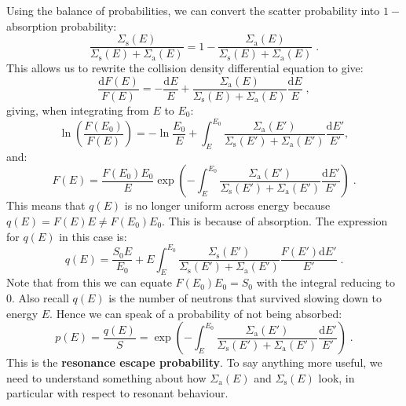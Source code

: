 Using the balance of probabilities, we can convert the scatter probability into $1 - $ absorption probability:
\begin{equation*}
    \frac{\Sigma_\mathrm{s}(E)}{\Sigma_\mathrm{s}(E) + \Sigma_\mathrm{a}(E)} = 1 - \frac{\Sigma_\mathrm{a}(E)}{\Sigma_\mathrm{s}(E) + \Sigma_\mathrm{a}(E)}\;\mathrm{.}
\end{equation*}
This allows us to rewrite the collision density differential equation to give:
\begin{equation*}
    \frac{\mathrm{d}F(E)}{F(E)} = -\frac{\mathrm{d}E}{E} + \frac{\Sigma_\mathrm{a}(E)}{\Sigma_\mathrm{s}(E) + \Sigma_\mathrm{a}(E)}\frac{\mathrm{d}E}{E}\;\mathrm{,}
\end{equation*}
giving, when integrating from $E$ to $E_0$:
\begin{equation*}
    \ln\left(\frac{F(E_0)}{F(E)}\right) = -\ln\frac{E_0}{E} + \int^{E_0}_E\frac{\Sigma_\mathrm{a}(E')}{\Sigma_\mathrm{s}(E') + \Sigma_\mathrm{a}(E')}\frac{\mathrm{d}E'}{E'}\mathrm{,}
\end{equation*}
and:
\begin{equation*}
    F(E) = \frac{F(E_0)E_0}{E}\exp\left(-\int^{E_0}_E\frac{\Sigma_\mathrm{a}(E')}{\Sigma_\mathrm{s}(E') + \Sigma_\mathrm{a}(E')}\frac{\mathrm{d}E'}{E'}\right)\;\mathrm{.}
\end{equation*}
This means that $q(E)$ is no longer uniform across energy because $q(E) = F(E)E \neq F(E_0)E_0$. This is because of absorption. The expression for $q(E)$ in this case is:
\begin{equation*}
    q(E) = \frac{S_0E}{E_0} + E\int^{E_0}_E \frac{\Sigma_\mathrm{s}(E')}{\Sigma_\mathrm{s}(E') + \Sigma_\mathrm{a}(E')}\frac{F(E')\mathrm{d}E'}{E'}\;\mathrm{.}
\end{equation*}
Note that from this we can equate $F(E_0)E_0 = S_0$ with the integral reducing to 0. Also recall $q(E)$ is the number of neutrons that survived slowing down to energy $E$. Hence we can speak of a probability of not being absorbed:
\begin{equation}\label{eq:res_escape_prob}
    p(E) = \frac{q(E)}{S} = \exp\left(-\int^{E_0}_E\frac{\Sigma_\mathrm{a}(E')}{\Sigma_\mathrm{s}(E') + \Sigma_\mathrm{a}(E')}\frac{\mathrm{d}E'}{E'}\right)\;\mathrm{.}
\end{equation}
This is the \textbf{resonance escape probability}. To say anything more useful, we need to understand something about how $\Sigma_\mathrm{a}(E)$ and $\Sigma_\mathrm{s}(E)$ look, in particular with respect to resonant behaviour.

